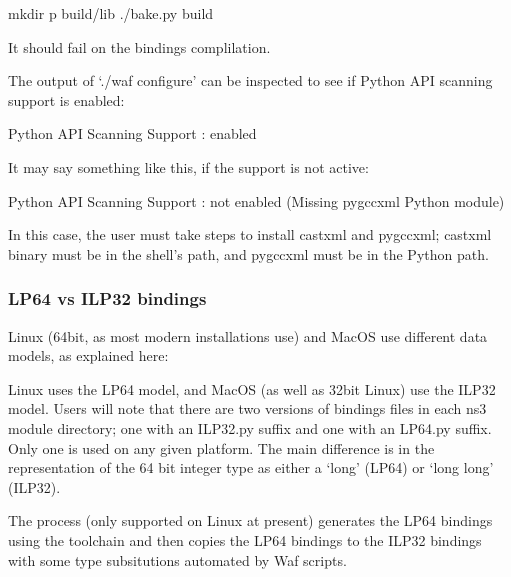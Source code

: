 \documentclass[letterpaper,10pt,english]{sphinxmanual}
\begin{document}
\begin{sphinxVerbatim}[commandchars=\\\{\}]
\PYGZdl{} mkdir \PYGZhy{}p build/lib
\PYGZdl{} ./bake.py build
\end{sphinxVerbatim}

It should fail on the  bindings complilation.

The output of ‘./waf configure’ can be inspected to see if Python API scanning
support is enabled:

\begin{sphinxVerbatim}[commandchars=\\\{\}]
Python API Scanning Support   : enabled
\end{sphinxVerbatim}

It may say something like this, if the support is not active:

\begin{sphinxVerbatim}[commandchars=\\\{\}]
Python API Scanning Support   : not enabled (Missing \PYGZsq{}pygccxml\PYGZsq{} Python module)
\end{sphinxVerbatim}

In this case, the user must take steps to install castxml and pygccxml;
castxml binary must be in the shell’s path, and pygccxml must be in the
Python path.


\subsubsection{LP64 vs ILP32 bindings}
\label{\detokenize{python:lp64-vs-ilp32-bindings}}
Linux (64\sphinxhyphen{}bit, as most modern installations use) and MacOS use different
data models, as explained here:  

Linux uses the LP64 model, and MacOS (as well as 32\sphinxhyphen{}bit Linux) use the ILP32
model.  Users will note that there are two versions of bindings files in
each ns\sphinxhyphen{}3 module directory; one with an ILP32.py suffix and one with
an LP64.py suffix.  Only one is used on any given platform.  The main
difference is in the representation of the 64 bit integer type as either
a ‘long’ (LP64) or ‘long long’ (ILP32).

The process (only supported on Linux at present) generates the LP64
bindings using the toolchain and then copies the LP64 bindings to the
ILP32 bindings with some type subsitutions automated by Waf scripts.
\end{document}
